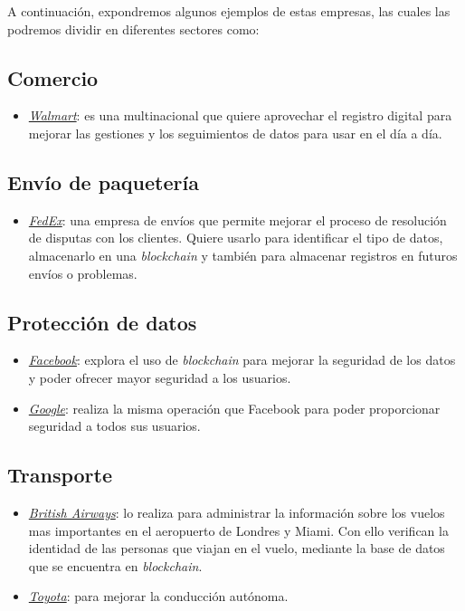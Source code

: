 A continuación, expondremos algunos ejemplos de estas empresas\cite{empresas}, las cuales las podremos dividir en diferentes sectores como: 
\subsection{Comercio}
\begin{itemize}
	\item \underline{\textit{Walmart}}: es una multinacional que quiere aprovechar el registro digital para mejorar las gestiones y los seguimientos de datos para usar en el día a día. 
\end{itemize}
\subsection{Envío de paquetería}
\begin{itemize}
	\item \underline{\textit{FedEx}}: una empresa de envíos que permite mejorar el proceso de resolución de disputas con los clientes. Quiere usarlo para identificar el tipo de datos, almacenarlo en una \textit{blockchain} y también para almacenar registros en futuros envíos o problemas.
\end{itemize}

\subsection{Protección de datos}
\begin{itemize}
	\item \underline{\textit{Facebook}}: explora el uso de \textit{blockchain} para mejorar la seguridad de los datos y poder ofrecer mayor seguridad a los usuarios.
	\item \underline{\textit{Google}}: realiza la misma operación que Facebook para poder proporcionar seguridad a todos sus usuarios.
\end{itemize}
\subsection{Transporte}
\begin{itemize}
	\item \underline{\textit{British Airways}}: lo realiza para administrar la información sobre los vuelos mas importantes en el aeropuerto de Londres y Miami. Con ello verifican la identidad de las personas que viajan en el vuelo, mediante la base de datos que se encuentra en \textit{blockchain}. 
	\item \underline{\textit{Toyota}}: para mejorar la conducción autónoma. 
\end{itemize}
